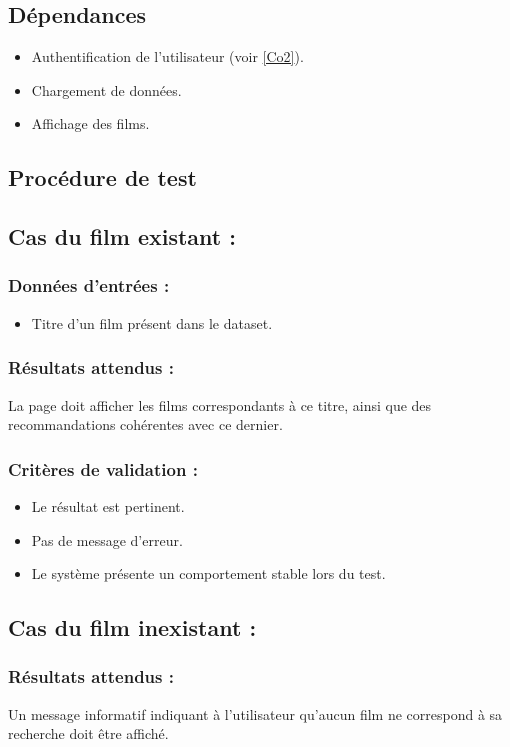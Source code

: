 \documentclass[a4paper,12pt]{report}
\begin{document}
\subsection*{Dépendances}
\begin{itemize}
    \item Authentification de l'utilisateur (voir \ref{Co2}).
    \item Chargement de données.
    \item Affichage des films.
\end{itemize}
\subsection*{Procédure de test}
\subsection*{Cas du film existant :}
\subsubsection{Données d'entrées :}
\begin{itemize}
    \item Titre d'un film présent dans le dataset.
\end{itemize}

\subsubsection{Résultats attendus :}

La page doit afficher les films correspondants à ce titre, ainsi que des recommandations cohérentes avec ce dernier.

\subsubsection{Critères de validation :}
\begin{itemize}
    \item Le résultat est pertinent.
    \item Pas de message d'erreur.
    \item Le système présente un comportement stable lors du test.
\end{itemize}

\subsection*{Cas du film inexistant :}
\subsubsection{Résultats attendus :}
Un message informatif indiquant à l'utilisateur qu'aucun film ne correspond à sa recherche doit être affiché.
\end{document}
